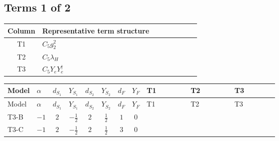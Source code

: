 \documentclass[8pt]{article}
\begin{document}
\begin{landscape}
\subsection*{Terms 1 of 2}
\begin{center}
\begin{tabular}{@{}c >{\raggedright\arraybackslash}p{0.82\linewidth}@{}}
\toprule
Column & Representative term structure \\
\midrule
T1 & \(\displaystyle C_{5} g_{2}^{2}\) \\
\midrule
T2 & \(\displaystyle C_{5} \lambda_H\) \\
\midrule
T3 & \(\displaystyle C_{5} Y_e Y_e^\dagger\) \\
\midrule
\bottomrule
\end{tabular}
\end{center}
\smallskip
\tiny
\begin{longtable}{@{}llcccccc >{\raggedright\arraybackslash}p{0.21\linewidth} >{\raggedright\arraybackslash}p{0.21\linewidth} >{\raggedright\arraybackslash}p{0.21\linewidth}@{}}
\toprule
Model & $\alpha$ & $d_{S_1}$ & $Y_{S_1}$ & $d_{S_2}$ & $Y_{S_2}$ & $d_F$ & $Y_F$ & T1 & T2 & T3 \\
\midrule
\endfirsthead
\toprule
Model & $\alpha$ & $d_{S_1}$ & $Y_{S_1}$ & $d_{S_2}$ & $Y_{S_2}$ & $d_F$ & $Y_F$ & T1 & T2 & T3 \\
\midrule
\endhead
T3-B & $-1$ & $2$ & $-\frac{1}{2}$ & $2$ & $\frac{1}{2}$ & $1$ & $0$ & \scriptsize\adjustbox{max width=\linewidth}{$\begin{gathered} - 3 C_{5} g_{2}^{2}\end{gathered}$} & \scriptsize\adjustbox{max width=\linewidth}{$\begin{gathered} 2 C_{5} \lambda_H\end{gathered}$} & \scriptsize\adjustbox{max width=\linewidth}{$\begin{gathered} - C_{5} Y_e Y_e^\dagger\end{gathered}$} \\
\midrule
T3-C & $-1$ & $2$ & $-\frac{1}{2}$ & $2$ & $\frac{1}{2}$ & $3$ & $0$ & \scriptsize\adjustbox{max width=\linewidth}{$\begin{gathered} - 3 C_{5} g_{2}^{2}\end{gathered}$} & \scriptsize\adjustbox{max width=\linewidth}{$\begin{gathered} 2 C_{5} \lambda_H\end{gathered}$} & \scriptsize\adjustbox{max width=\linewidth}{$\begin{gathered} - C_{5} Y_e Y_e^\dagger\end{gathered}$} \\

\end{longtable}
\end{landscape}
\end{document}
